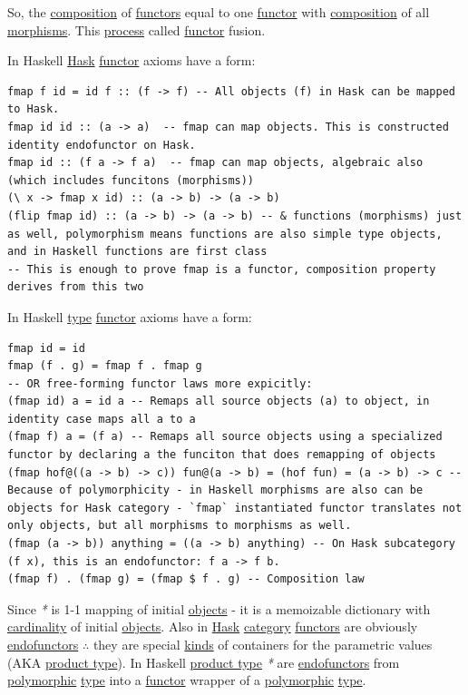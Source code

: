 \documentclass[a4paper,14pt,oneside]{book}
\begin{document}
So, the \hyperref[org6a6c663]{composition} of \hyperref[orge2a0506]{functors} equal to one \hyperref[org3bd25a7]{functor} with \hyperref[org6a6c663]{composition} of all \hyperref[orgfe88a73]{morphisms}. This \hyperref[orgc61476a]{process} called \hyperref[org3bd25a7]{functor} fusion.

In Haskell \hyperref[orgc90b86f]{Hask} \hyperref[org3bd25a7]{functor} axioms have a form:
\begin{verbatim}
fmap f id = id f :: (f -> f) -- All objects (f) in Hask can be mapped to Hask.
fmap id id :: (a -> a)  -- fmap can map objects. This is constructed identity endofunctor on Hask.
fmap id :: (f a -> f a)  -- fmap can map objects, algebraic also (which includes funcitons (morphisms))
(\ x -> fmap x id) :: (a -> b) -> (a -> b)
(flip fmap id) :: (a -> b) -> (a -> b) -- & functions (morphisms) just as well, polymorphism means functions are also simple type objects, and in Haskell functions are first class
-- This is enough to prove fmap is a functor, composition property derives from this two
\end{verbatim}

In Haskell \hyperref[org4e3af4c]{type} \hyperref[org3bd25a7]{functor} axioms have a form:
\begin{verbatim}
fmap id = id
fmap (f . g) = fmap f . fmap g
-- OR free-forming functor laws more expicitly:
(fmap id) a = id a -- Remaps all source objects (a) to object, in identity case maps all a to a
(fmap f) a = (f a) -- Remaps all source objects using a specialized functor by declaring a the funciton that does remapping of objects
(fmap hof@((a -> b) -> c)) fun@(a -> b) = (hof fun) = (a -> b) -> c -- Because of polymorphicity - in Haskell morphisms are also can be objects for Hask category - `fmap` instantiated functor translates not only objects, but all morphisms to morphisms as well.
(fmap (a -> b)) anything = ((a -> b) anything) -- On Hask subcategory (f x), this is an endofunctor: f a -> f b. 
(fmap f) . (fmap g) = (fmap $ f . g) -- Composition law
\end{verbatim}

Since \emph{*} is 1-1 mapping of initial \hyperref[org176276a]{objects} - it is a memoizable dictionary with \hyperref[org0ad81b6]{cardinality} of initial \hyperref[org176276a]{objects}. Also in \hyperref[orgc90b86f]{Hask} \hyperref[orgfd021ba]{category} \hyperref[orge2a0506]{functors} are obviously \hyperref[org2763c1d]{endofunctors} \(\therefore\) they are special \hyperref[org4d5af64]{kinds} of containers for the parametric values (AKA \hyperref[orgf7f6b47]{product type}). In Haskell \hyperref[orgf7f6b47]{product type} \emph{*} are \hyperref[org2763c1d]{endofunctors} from \hyperref[org480159e]{polymorphic} \hyperref[org4e3af4c]{type} into a \hyperref[org3bd25a7]{functor} wrapper of a \hyperref[org480159e]{polymorphic} \hyperref[org4e3af4c]{type}. 
\end{document}
